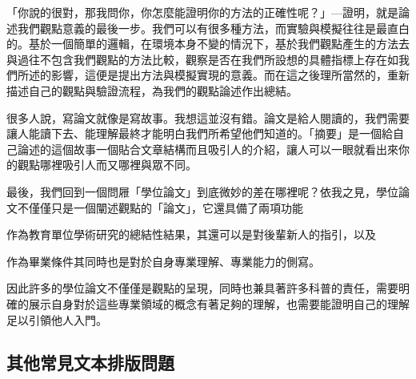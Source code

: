\documentclass[12pt]{report}
\theoremstyle{plain}
\begin{document}
「你說的很對，那我問你，你怎麼能證明你的方法的正確性呢？」---證明，就是論述我們觀點意義的最後一步。我們可以有很多種方法，而實驗與模擬往往是最直白的。基於一個簡單的邏輯，在環境本身不變的情況下，基於我們觀點產生的方法去與過往不包含我們觀點的方法比較，觀察是否在我們所設想的具體指標上存在如我們所述的影響，這便是提出方法與模擬實現的意義。而在這之後理所當然的，重新描述自己的觀點與驗證流程，為我們的觀點論述作出總結。

很多人說，寫論文就像是寫故事。我想這並沒有錯。論文是給人閱讀的，我們需要讓人能讀下去、能理解最終才能明白我們所希望他們知道的。「摘要」是一個給自己論述的這個故事一個貼合文章結構而且吸引人的介紹，讓人可以一眼就看出來你的觀點哪裡吸引人而又哪裡與眾不同。

最後，我們回到一個問屜「學位論文」到底微妙的差在哪裡呢？依我之見，學位論文不僅僅只是一個闡述觀點的「論文」，它還具備了兩項功能
\begin{enumerate*}
    \item 作為教育單位學術研究的總結性結果，其還可以是對後輩新人的指引，以及
    \item 作為畢業條件其同時也是對於自身專業理解、專業能力的側寫。
\end{enumerate*}
因此許多的學位論文不僅僅是觀點的呈現，同時也兼具著許多科普的責任，需要明確的展示自身對於這些專業領域的概念有著足夠的理解，也需要能證明自己的理解足以引領他人入門。

\subsection{其他常見文本排版問題}
\end{document}
